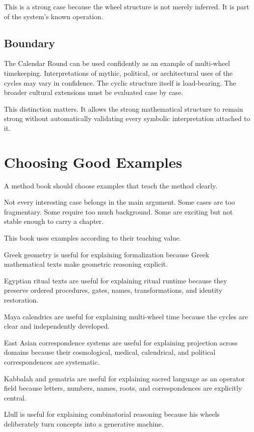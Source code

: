 \documentclass[11pt]{book}
\begin{document}
This is a strong case because the wheel structure is not merely inferred. It is part of the system's known operation.

\subsection{Boundary}

The Calendar Round can be used confidently as an example of multi-wheel timekeeping. Interpretations of mythic, political, or architectural uses of the cycles may vary in confidence. The cyclic structure itself is load-bearing. The broader cultural extensions must be evaluated case by case.

This distinction matters. It allows the strong mathematical structure to remain strong without automatically validating every symbolic interpretation attached to it.

\section{Choosing Good Examples}

A method book should choose examples that teach the method clearly.

Not every interesting case belongs in the main argument. Some cases are too fragmentary. Some require too much background. Some are exciting but not stable enough to carry a chapter.

This book uses examples according to their teaching value.

Greek geometry is useful for explaining formalization because Greek mathematical texts make geometric reasoning explicit.

Egyptian ritual texts are useful for explaining ritual runtime because they preserve ordered procedures, gates, names, transformations, and identity restoration.

Maya calendrics are useful for explaining multi-wheel time because the cycles are clear and independently developed.

East Asian correspondence systems are useful for explaining projection across domains because their cosmological, medical, calendrical, and political correspondences are systematic.

Kabbalah and gematria are useful for explaining sacred language as an operator field because letters, numbers, names, roots, and correspondences are explicitly central.

Llull is useful for explaining combinatorial reasoning because his wheels deliberately turn concepts into a generative machine.
\end{document}
